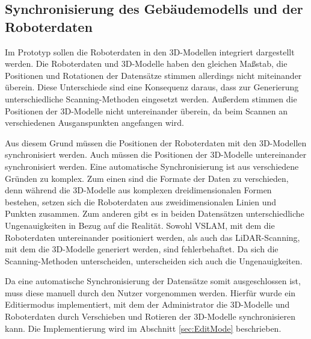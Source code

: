 \subsection{Synchronisierung des Gebäudemodells und der Roboterdaten}
Im Prototyp sollen die Roboterdaten in den 3D-Modellen integriert dargestellt werden. Die Roboterdaten und 3D-Modelle haben den gleichen Maßstab, die Positionen und Rotationen der Datensätze stimmen allerdings nicht miteinander überein. Diese Unterschiede sind eine Konsequenz daraus, dass zur Generierung unterschiedliche Scanning-Methoden eingesetzt werden. Außerdem stimmen die Positionen der 3D-Modelle nicht untereinander überein, da beim Scannen an verschiedenen Ausganspunkten angefangen wird.

Aus diesem Grund müssen die Positionen der Roboterdaten mit den 3D-Modellen synchronisiert werden. Auch müssen die Positionen der 3D-Modelle untereinander synchronisiert werden. Eine automatische Synchronisierung ist aus verschiedene Gründen zu komplex. Zum einen sind die Formate der Daten zu verschieden, denn während die 3D-Modelle aus komplexen dreidimensionalen Formen bestehen, setzen sich die Roboterdaten aus zweidimensionalen Linien und Punkten zusammen. Zum anderen gibt es in beiden Datensätzen unterschiedliche Ungenauigkeiten in Bezug auf die Realität. Sowohl \ac{VSLAM}, mit dem die Roboterdaten untereinander positioniert werden, als auch das \ac{LiDAR}-Scanning, mit dem die 3D-Modelle generiert werden, sind fehlerbehaftet. Da sich die Scanning-Methoden unterscheiden, unterscheiden sich auch die Ungenauigkeiten.

Da eine automatische Synchronisierung der Datensätze somit ausgeschlossen ist, muss diese manuell durch den Nutzer vorgenommen werden. Hierfür wurde ein Editiermodus implementiert, mit dem der Administrator die 3D-Modelle und Roboterdaten durch Verschieben und Rotieren der 3D-Modelle synchronisieren kann. Die Implementierung wird im Abschnitt \ref{sec:EditMode} beschrieben.
